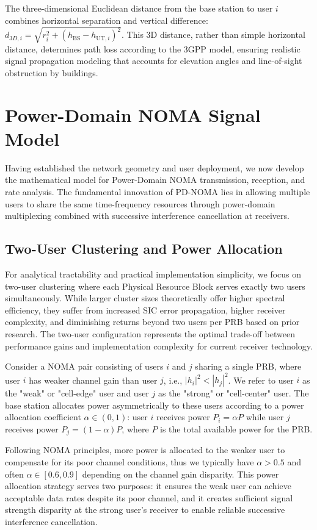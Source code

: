 The three-dimensional Euclidean distance from the base station to user $i$ combines horizontal separation and vertical difference: $d_{3D,i} = \sqrt{r_i^2 + (h_{\text{BS}} - h_{\text{UT},i})^2}$. This 3D distance, rather than simple horizontal distance, determines path loss according to the 3GPP model, ensuring realistic signal propagation modeling that accounts for elevation angles and line-of-sight obstruction by buildings.

\section{Power-Domain NOMA Signal Model}

Having established the network geometry and user deployment, we now develop the mathematical model for Power-Domain NOMA transmission, reception, and rate analysis. The fundamental innovation of PD-NOMA lies in allowing multiple users to share the same time-frequency resources through power-domain multiplexing combined with successive interference cancellation at receivers.

\subsection{Two-User Clustering and Power Allocation}

For analytical tractability and practical implementation simplicity, we focus on two-user clustering where each Physical Resource Block serves exactly two users simultaneously. While larger cluster sizes theoretically offer higher spectral efficiency, they suffer from increased SIC error propagation, higher receiver complexity, and diminishing returns beyond two users per PRB based on prior research. The two-user configuration represents the optimal trade-off between performance gains and implementation complexity for current receiver technology.

Consider a NOMA pair consisting of users $i$ and $j$ sharing a single PRB, where user $i$ has weaker channel gain than user $j$, i.e., $|h_i|^2 < |h_j|^2$. We refer to user $i$ as the "weak" or "cell-edge" user and user $j$ as the "strong" or "cell-center" user. The base station allocates power asymmetrically to these users according to a power allocation coefficient $\alpha \in (0,1)$: user $i$ receives power $P_i = \alpha P$ while user $j$ receives power $P_j = (1-\alpha) P$, where $P$ is the total available power for the PRB.

Following NOMA principles, more power is allocated to the weaker user to compensate for its poor channel conditions, thus we typically have $\alpha > 0.5$ and often $\alpha \in [0.6, 0.9]$ depending on the channel gain disparity. This power allocation strategy serves two purposes: it ensures the weak user can achieve acceptable data rates despite its poor channel, and it creates sufficient signal strength disparity at the strong user's receiver to enable reliable successive interference cancellation.

